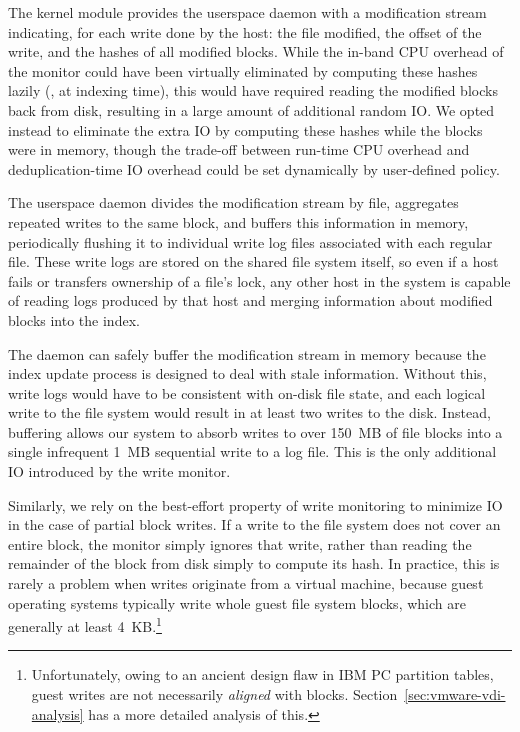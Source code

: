 
The kernel module provides the userspace daemon with a modification
stream indicating, for each write done by the host: the file modified,
the offset of the write, and the \shaone hashes of all modified
blocks.  While the in-band CPU overhead of the monitor could have been
virtually eliminated by computing these hashes lazily (\eg, at
indexing time), this would have required reading the modified blocks
back from disk, resulting in a large amount of additional random IO.
We opted instead to eliminate the extra IO by computing these hashes
while the blocks were in memory, though the trade-off between run-time
CPU overhead and deduplication-time IO overhead could be set
dynamically by user-defined policy.

The userspace daemon divides the modification stream by file,
aggregates repeated writes to the same block, and buffers this
information in memory, periodically flushing it to individual write
log files associated with each regular file.  These write logs are
stored on the shared file system itself, so even if
a host fails or transfers ownership of a file's lock, any other host
in the system is capable of reading logs produced by that host and
merging information about modified blocks into the index.

The daemon can safely buffer the modification stream in memory because
the index update process is designed to deal with stale
information.  Without this, write logs would have to be consistent
with on-disk file state, and each logical write to the file system
would result in at least
two writes to the disk.  Instead, buffering allows our system to
absorb writes to over 150~MB of file blocks into a single infrequent
1~MB sequential write to a log file.  This is the only additional IO
introduced by the write monitor.

Similarly, we rely on the best-effort property of write monitoring to
minimize IO in the case of partial block writes.  If a write
to the file system does not cover an entire block, the monitor simply
ignores that write, rather than reading the remainder of the block
from disk simply to compute its hash.  In practice, this is rarely a
problem when writes originate from a virtual machine, because guest
operating systems typically write whole guest file system blocks,
which are generally at least 4~KB.\footnote{Unfortunately, owing to an
  ancient design flaw in IBM PC partition tables, guest writes are not
  necessarily \emph{aligned} with \DeDe blocks.
  Section~\ref{sec:vmware-vdi-analysis} has a more detailed
  analysis of this.}

